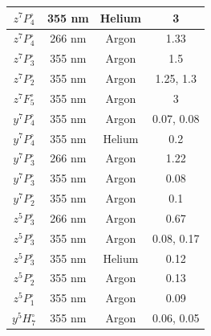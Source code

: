 \documentclass[12pt,twoside]{reedthesis}
\begin{document}
\begin{longtable}{||c|c|c|c||}
	$z^{7}P^{\circ}_{4}$ & 355 nm           & Helium     & 3                                                         \\\hline
	$z^{7}P^{\circ}_{4}$ & 266 nm           & Argon      & 1.33                                                      \\\hline
	$z^{7}P^{\circ}_{3}$ & 355 nm           & Argon      & 1.5                                                       \\\hline
	$z^{7}P^{\circ}_{2}$ & 355 nm           & Argon      & 1.25, 1.3                                                 \\\hline
	$z^{7}F^{\circ}_{5}$ & 355 nm           & Argon      & 3                                                         \\\hline
	$y^{7}P^{\circ}_{4}$ & 355 nm           & Argon      & 0.07, 0.08                                                \\\hline
	$y^{7}P^{\circ}_{4}$ & 355 nm           & Helium     & 0.2                                                       \\\hline
	$y^{7}P^{\circ}_{3}$ & 266 nm           & Argon      & 1.22                                                      \\\hline
	$y^{7}P^{\circ}_{3}$ & 355 nm           & Argon      & 0.08                                                      \\\hline
	$y^{7}P^{\circ}_{2}$ & 355 nm           & Argon      & 0.1                                                       \\\hline
	$z^{5}P^{\circ}_{3}$ & 266 nm           & Argon      & 0.67                                                      \\\hline
	$z^{5}P^{\circ}_{3}$ & 355 nm           & Argon      & 0.08, 0.17                                                \\\hline
	$z^{5}P^{\circ}_{3}$ & 355 nm           & Helium     & 0.12                                                      \\\hline
	$z^{5}P^{\circ}_{2}$ & 355 nm           & Argon      & 0.13                                                      \\\hline
	$z^{5}P^{\circ}_{1}$ & 355 nm           & Argon      & 0.09                                                      \\\hline
	$y^{5}H^{\circ}_{7}$ & 355 nm           & Argon      & 0.06, 0.05                                                \\\hline

\end{longtable}
\end{document}
